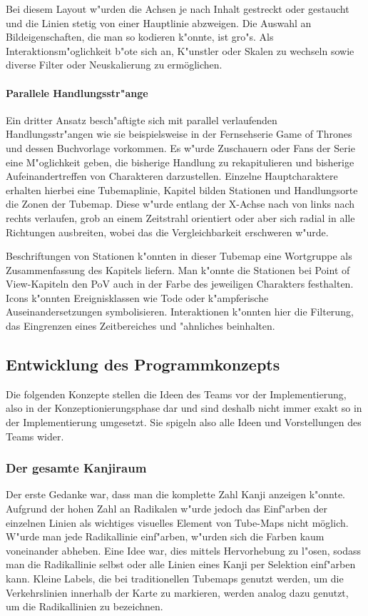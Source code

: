 Bei diesem Layout w"urden die Achsen je nach Inhalt gestreckt oder gestaucht und die Linien stetig von einer Hauptlinie abzweigen. Die Auswahl an Bildeigenschaften, die man so kodieren k"onnte, ist gro"s. Als Interaktionsm"oglichkeit b"ote sich an, K"unstler oder Skalen zu wechseln sowie diverse Filter oder Neuskalierung zu ermöglichen. 

\paragraph{Parallele Handlungsstr"ange}
Ein dritter Ansatz besch"aftigte sich mit parallel verlaufenden Handlungsstr"angen wie sie beispielsweise in der Fernsehserie Game of Thrones und dessen Buchvorlage vorkommen. Es w"urde Zuschauern oder Fans der Serie eine M"oglichkeit geben, die bisherige Handlung zu rekapitulieren und bisherige Aufeinandertreffen von Charakteren darzustellen. Einzelne Hauptcharaktere erhalten hierbei eine Tubemaplinie, Kapitel bilden Stationen und Handlungsorte die Zonen der Tubemap. Diese w"urde entlang der X-Achse nach von links nach rechts verlaufen, grob an einem Zeitstrahl orientiert oder aber sich radial in alle Richtungen ausbreiten, wobei das die Vergleichbarkeit erschweren w"urde.

Beschriftungen von Stationen k"onnten in dieser Tubemap eine Wortgruppe als Zusammenfassung des Kapitels liefern. Man k"onnte die Stationen bei Point of View-Kapiteln den PoV auch in der Farbe des jeweiligen Charakters festhalten. Icons k"onnten Ereignisklassen wie Tode oder k"ampferische Auseinandersetzungen symbolisieren. Interaktionen k"onnten hier die Filterung, das Eingrenzen eines Zeitbereiches und "ahnliches beinhalten. 


\subsection{Entwicklung des Programmkonzepts}
Die folgenden Konzepte stellen die Ideen des Teams vor der Implementierung, also in der Konzeptionierungsphase dar und sind deshalb nicht immer exakt so in der Implementierung umgesetzt. Sie spigeln also alle Ideen und Vorstellungen des Teams wider. 
\subsubsection{Der gesamte Kanjiraum}
Der erste Gedanke war, dass man die komplette Zahl Kanji anzeigen k"onnte. Aufgrund der hohen Zahl an Radikalen w"urde jedoch das Einf"arben der einzelnen Linien als wichtiges visuelles Element von Tube-Maps nicht möglich. W"urde man jede Radikallinie einf"arben, w"urden sich die Farben kaum voneinander abheben. Eine Idee war, dies mittels Hervorhebung zu l"osen, sodass man die Radikallinie selbst oder alle Linien eines Kanji per Selektion einf"arben kann. Kleine Labels, die bei traditionellen Tubemaps genutzt werden, um die Verkehrslinien innerhalb der Karte zu markieren, werden analog dazu genutzt, um die Radikallinien zu bezeichnen.


